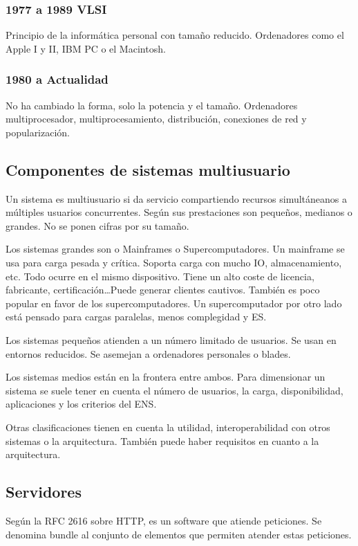     \subsubsection{1977 a 1989 VLSI}
        Principio de la informática personal con tamaño reducido. Ordenadores como el Apple I y II, IBM PC o el Macintosh.

    \subsubsection{1980 a Actualidad}
        No ha cambiado la forma, solo la potencia y el tamaño. Ordenadores multiprocesador, multiprocesamiento, distribución, conexiones de red y popularización.

\subsection{Componentes de sistemas multiusuario}
    Un sistema es multiusuario si da servicio compartiendo recursos simultáneanos a múltiples usuarios concurrentes. Según sus prestaciones son pequeños, medianos o grandes. No se ponen cifras por su tamaño.
    
    Los sistemas grandes son o Mainframes o Supercomputadores. Un mainframe se usa para carga pesada y crítica. Soporta carga con mucho IO, almacenamiento, etc. Todo ocurre en el mismo dispositivo. Tiene un alto coste de licencia, fabricante, certificación\dots Puede generar clientes cautivos. También es poco popular en favor de los supercomputadores. Un supercomputador por otro lado está pensado para cargas paralelas, menos complegidad y ES.

    Los sistemas pequeños atienden a un número limitado de usuarios. Se usan en entornos reducidos. Se asemejan a ordenadores personales o blades.

    Los sistemas medios están en la frontera entre ambos. Para dimensionar un sistema se suele tener en cuenta el número de usuarios, la carga, disponibilidad, aplicaciones y los criterios del ENS.

    Otras clasificaciones tienen en cuenta la utilidad, interoperabilidad con otros sistemas o la arquitectura. También puede haber requisitos en cuanto a la arquitectura.

\subsection{Servidores}
    Según la RFC 2616 sobre HTTP, es un software que atiende peticiones. Se denomina bundle al conjunto de elementos que permiten atender estas peticiones. 

